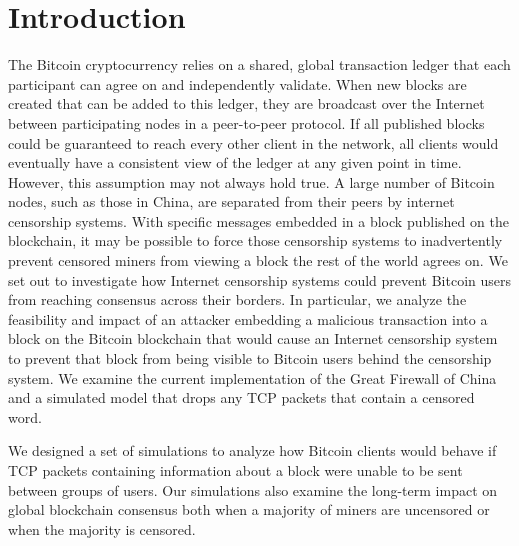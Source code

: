 \section{Introduction}
The Bitcoin cryptocurrency relies on a shared, global transaction ledger that each participant can agree on and independently validate. 
When new blocks are created that can be added to this ledger, they are broadcast over the Internet between participating nodes in a peer-to-peer protocol. 
If all published blocks could be guaranteed to reach every other client in the network, all clients would eventually have a consistent view of the ledger at any given point in time. 
However, this assumption may not always hold true. A large number of Bitcoin nodes, such as those in China, are separated from their peers by internet censorship systems. 
With specific messages embedded in a block published on the blockchain, it may be possible to force those censorship systems to inadvertently prevent censored miners from viewing a block the rest of the world agrees on.
We set out to investigate how Internet censorship systems could prevent Bitcoin users from reaching consensus across their borders.
In particular, we analyze the feasibility and impact of an attacker embedding a malicious transaction into a block on the Bitcoin blockchain that would cause an Internet censorship system to prevent that block from being visible to Bitcoin users behind the censorship system.
We examine the current implementation of the Great Firewall of China and a simulated model that drops any TCP packets that contain a censored word.

We designed a set of simulations to analyze how Bitcoin clients would behave if TCP packets containing information about a block were unable to be sent between groups of users.
Our simulations also examine the long-term impact on global blockchain consensus both when a majority of miners are uncensored or when the majority is censored.



